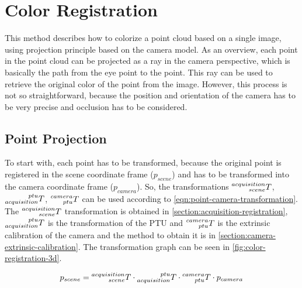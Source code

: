 \section{Color Registration}
\label{section:color-registration}

This method describes how to colorize a point cloud based on a single image, using projection principle based on the camera model. As an overview, each point in the point cloud can be projected as a ray in the camera perspective, which is basically the path from the eye point to the point. This ray can be used to retrieve the original color of the point from the image. However, this process is not so straightforward, because the position and orientation of the camera has to be very precise and occlusion has to be considered.

\subsection{Point Projection}

To start with, each point has to be transformed, because the original point is registered in the scene coordinate frame ($p_{scene}$) and has to be transformed into the camera coordinate frame ($p_{camera}$). So, the transformations $\prescript{acquisition}{scene}{T}$, $\prescript{ptu}{acquisition}{T}$, $\prescript{camera}{ptu}{T}$ can be used according to \cref{eqn:point-camera-transformation}. The $\prescript{acquisition}{scene}{T}$ transformation is obtained in \cref{section:acquisition-registration}, $\prescript{ptu}{acquisition}{T}$ is the transformation of the PTU and $\prescript{camera}{ptu}{T}$ is the extrinsic calibration of the camera and the method to obtain it is in \cref{section:camera-extrinsic-calibration}. The transformation graph can be seen in \cref{fig:color-registration-3d}.

\begin{equation}
    \label{eqn:point-camera-transformation}
    p_{scene} =
        \prescript{acquisition}{scene}{T} \cdot 
        \prescript{ptu}{acquisition}{T} \cdot
        \prescript{camera}{ptu}{T} \cdot p_{camera}
\end{equation}

